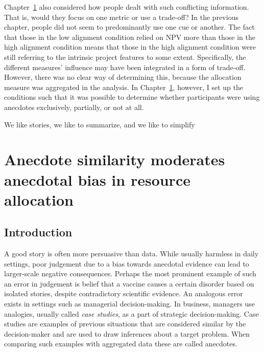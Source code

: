 \documentclass[a4paper, nobind, dvipsnames]{templates/ociamthesis}
\theoremstyle{definition}
\theoremstyle{definition}
\theoremstyle{definition}
\theoremstyle{definition}
\theoremstyle{remark}
\begin{document}
Chapter~\ref{anecdotes} also considered how people dealt with such conflicting
information. That is, would they focus on one metric or use a trade-off? In the
previous chapter, people did not seem to predominantly use one cue or another.
The fact that those in the low alignment condition relied on NPV more than those
in the high alignment condition means that those in the high alignment condition
were still referring to the intrinsic project features to some extent.
Specifically, the different measures' influence may have been integrated in a
form of trade-off. However, there was no clear way of determining this, because
the allocation measure was aggregated in the analysis. In
Chapter~\ref{anecdotes}, however, I set up the conditions such that it was
possible to determine whether participants were using anecdotes exclusively,
partially, or not at all.



\begin{savequote}
We like stories, we like to summarize, and we like to simplify
\end{savequote}

\hypertarget{anecdotes}{%
\chapter{Anecdote similarity moderates anecdotal bias in resource allocation}\label{anecdotes}}

\minitoc

\section{Introduction}

A good story is often more persuasive than data. While usually harmless in daily
settings, poor judgement due to a bias towards anecdotal evidence can lead to
larger-scale negative consequences. Perhaps the most prominent example of such
an error in judgement is belief that a vaccine causes a certain disorder based
on isolated stories, despite contradictory scientific evidence. An analogous
error exists in settings such as managerial decision-making. In business,
managers use analogies, usually called \emph{case studies}, as a part of strategic
decision-making. Case studies are examples of previous situations that are
considered similar by the decision-maker and are used to draw inferences about a
target problem. When comparing such examples with aggregated data these are
called anecdotes.
\end{document}
